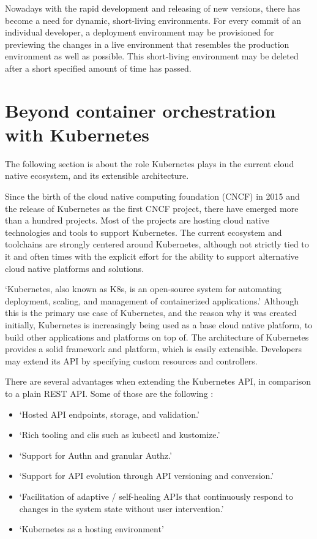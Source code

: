 Nowadays with the rapid development and releasing of new versions,
there has become a need for dynamic, short-living environments.
For every commit of an individual developer,
a deployment environment may be provisioned for previewing the changes
in a live environment that resembles the production environment as well as possible.
This short-living environment may be deleted after a short specified amount of time
has passed.






\section{Beyond container orchestration with Kubernetes}
\label{theoretical-background:kubernetes}

The following section is about
the role Kubernetes plays in the current cloud native ecosystem,
and its extensible architecture.

Since the birth of the cloud native computing foundation (CNCF) in 2015 and the release of Kubernetes as the first CNCF project,
there have emerged more than a hundred projects.
Most of the projects are hosting cloud native technologies and tools to support Kubernetes.
The current ecosystem and toolchains are strongly centered around Kubernetes,
although not strictly tied to it and often times with the explicit effort
for the ability to support alternative cloud native platforms and solutions.

\enquote*{Kubernetes, also known as K8s, is an open-source system for automating deployment, scaling, and management of containerized applications.}
\autocite{kubernetesIoWebsite}
Although this is the primary use case of Kubernetes,
and the reason why it was created initially,
Kubernetes is increasingly being used as a base cloud native platform,
to build other applications and platforms on top of.
The architecture of Kubernetes provides a solid framework and platform,
which is easily extensible.
Developers may extend its API by specifying custom resources and controllers.

There are several advantages when extending the Kubernetes API,
in comparison to a plain REST API.
Some of those are the following
\autocite{kubebuilderBookWebsite}:

\begin{itemize}
	\item \enquote*{Hosted API endpoints, storage, and validation.}
	\item \enquote*{Rich tooling and clis such as kubectl and kustomize.}
	\item \enquote*{Support for Authn and granular Authz.}
	\item \enquote*{Support for API evolution through API versioning and conversion.}
	\item \enquote*{Facilitation of adaptive / self-healing APIs that continuously respond to changes in the system state without user intervention.}
	\item \enquote*{Kubernetes as a hosting environment}
	\autocite{kubebuilderBookWebsite}
\end{itemize}

